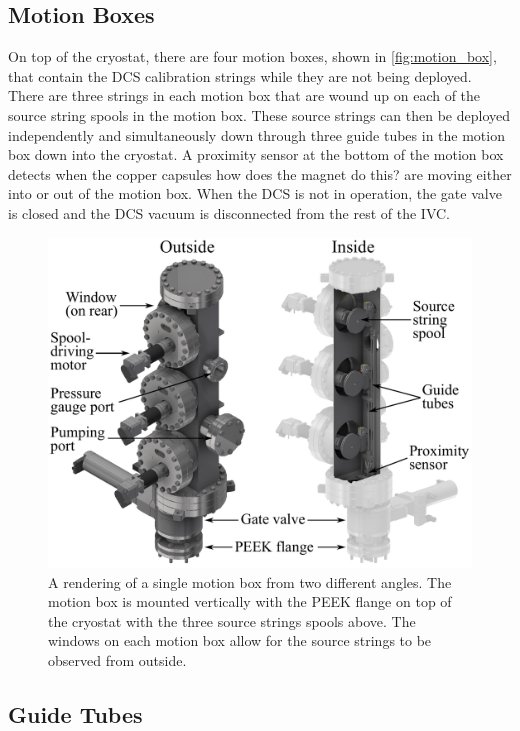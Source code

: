 \subsection{Motion Boxes}
On top of the cryostat, there are four motion boxes, shown in \autoref{fig:motion_box}, that contain the DCS calibration strings while they are not being deployed. There are three strings in each motion box that are wound up on each of the source string spools in the motion box. These source strings can then be deployed independently and simultaneously down through three guide tubes in the motion box down into the cryostat. A proximity sensor at the bottom of the motion box detects when the copper capsules \color{red} how does the magnet do this? \color{black} are moving either into or out of the motion box. When the DCS is not in operation, the gate valve is closed and the DCS vacuum is disconnected from the rest of the IVC.
\begin{figure}[htpb]
\includegraphics[width=0.9\linewidth]{Figures/motion_box.pdf}
\caption[A rendering of a single motion box from two different angles.]{A rendering of a single motion box from two different angles. The motion box is mounted vertically with the PEEK flange on top of the cryostat with the three source strings spools above. The windows on each motion box allow for the source strings to be observed from outside.}
\label{fig:motion_box}
\end{figure}

\subsection{Guide Tubes}

